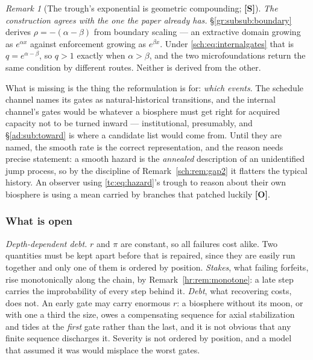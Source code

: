 \documentclass[11pt]{article}
\numberwithin{equation}{section}
\theoremstyle{plain}
\theoremstyle{definition}
\theoremstyle{remark}
\newtheorem{remark}[theorem]{Remark}
\begin{document}
\begin{remark}[The trough's exponential is geometric compounding;
\textbf{[S]}]
\emph{The construction agrees with the one the paper already has.}
\S\ref{gr:subsub:boundary} derives $\rho=-(\alpha-\beta)$ from boundary
scaling --- an extractive domain growing as $e^{\alpha x}$ against
enforcement growing as $e^{\beta x}$. Under \eqref{sch:eq:internalgates}
that is $q=e^{\alpha-\beta}$, so $q>1$ exactly when $\alpha>\beta$, and
the two microfoundations return the same condition by different routes.
Neither is derived from the other.
\end{remark}

What is missing is the thing the reformulation is for: \emph{which
events}. The schedule channel names its gates as natural-historical
transitions, and the internal channel's gates would be whatever a
biosphere must get right for acquired capacity not to be turned inward
--- institutional, presumably, and \S\ref{ad:sub:toward} is where a
candidate list would come from. Until they are named, the smooth rate is the correct representation, and the reason needs precise statement: a
smooth hazard is the \emph{annealed} description of an unidentified jump
process, so by the discipline of Remark~\ref{sch:rem:gap2} it flatters
the typical history. An observer using \eqref{tc:eq:hazard}'s trough to
reason about their own biosphere is using a mean carried by branches that
patched luckily \textbf{[O]}.

\subsubsection{What is open}\label{sch:subsub:open}

\emph{Depth-dependent debt.} $r$ and $\pi$ are constant, so all failures
cost alike. Two quantities must be kept apart before that is repaired,
since they are easily run together and only one of them is ordered by
position. \emph{Stakes}, what failing forfeits, rise monotonically
along the chain, by Remark~\ref{hr:rem:monotone}: a late step carries
the improbability of every step behind it. \emph{Debt}, what
recovering costs, does not. An early gate may carry enormous $r$: a
biosphere without its moon, or with one a third the size, owes a
compensating sequence for axial stabilization and tides at the
\emph{first} gate rather than the last, and it is not obvious that any
finite sequence discharges it. Severity is not ordered by position, and
a model that assumed it was would misplace the worst gates.
\end{document}
